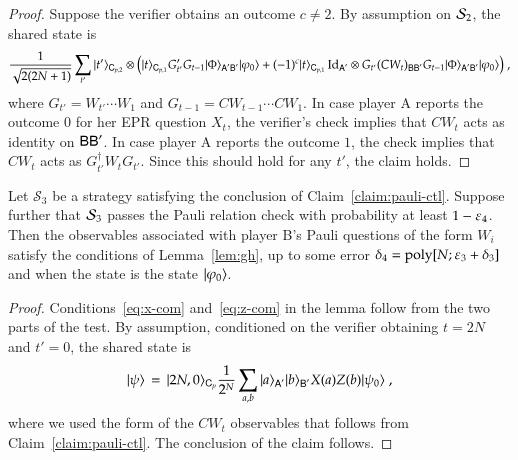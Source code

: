 \begin{proof}
Suppose the verifier obtains an outcome $c\neq 2$. By assumption on $\mathcal{S}_2$, the shared state is 
\[ \frac{1}{\sqrt{2(2N+1)}}\sum_{t'} |t'\rangle_{{\textsf{C}}_{p,2}}\otimes \big(|t\rangle_{{\textsf{C}}_{p,1}} G'_{t'} G_{t-1} |\Phi\rangle_{{\textsf{A}}'{\textsf{B}}'}  |\varphi_0\rangle + (-1)^c  |t\rangle_{{\textsf{C}}_{p,1}} \mathop{\mathrm{Id}}\!\mathinner{}_{{\textsf{A}}'} \otimes G_{t'} (CW_t)_{{\textsf{B}}{\textsf{B}}'} G_{t-1}|\Phi\rangle_{{\textsf{A}}'{\textsf{B}}'} |\varphi_0\rangle\big)\;,\]
where $G_{t'} = W_{t'}\cdots W_1$ and $G_{t-1} =  CW_{t-1}\cdots CW_1$. 
In case player A reports the outcome $0$ for her EPR question $X_t$, the verifier's check implies that $CW_t$ acts as identity on ${\textsf{B}}{\textsf{B}}'$. In case player A reports the outcome $1$, the check implies that $CW_t$ acts as $G_{t'}^\dagger W_t G_{t'}$. Since this should hold for any $t'$, the claim holds. 
\end{proof}

\begin{claim}\label{claim:pauli-relation}
Let $\mathcal{S}_3$ be a strategy satisfying the conclusion of Claim~\ref{claim:pauli-ctl}. Suppose further that $\mathcal{S}_3$ passes the Pauli relation check with probability at least $1-\varepsilon_4$. Then the observables associated with player B's Pauli questions of the form $W_i$ satisfy the conditions of Lemma~\ref{lem:gh}, up to some error $\delta_4 = \operatorname{poly}[N;\varepsilon_3+\delta_3]$ and when the state is the state $|\varphi_0\rangle$. 
\end{claim}

\begin{proof}
Conditions~\eqref{eq:x-com} and~\eqref{eq:z-com} in the lemma follow from the two parts of the test. By assumption, conditioned on the verifier obtaining $t=2N$ and $t'=0$, the shared state is 
\[|\psi\rangle \,=\, |2N,0\rangle_{{\textsf{C}}_p} \frac{1}{2^N}\sum_{a,b} |a\rangle_{{\textsf{A}}'} |b\rangle_{{\textsf{B}}'} X(a)Z(b)|\psi_0\rangle\;,\]
where we used the form of the $CW_t$ observables that follows from Claim~\ref{claim:pauli-ctl}. The conclusion of the claim follows. 
\end{proof}